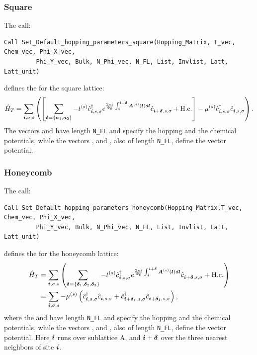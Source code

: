 \subsubsection*{Square}
The call:
\begin{lstlisting}[style=fortran]
Call Set_Default_hopping_parameters_square(Hopping_Matrix, T_vec, Chem_vec, Phi_X_vec,  
         Phi_Y_vec, Bulk, N_Phi_vec, N_FL, List, Invlist, Latt, Latt_unit)
\end{lstlisting}
defines  the   for the square  lattice: 
\begin{equation}
\hat{H}_T  =   \sum_{\boldsymbol{i}, \sigma, s}  \left( \left[ \sum_{ \boldsymbol{\delta} = \left\{ \boldsymbol{a}_1, \boldsymbol{a}_2\right\} }    - t^{(s)} \hat{c}^{\dagger}_{\boldsymbol{i},s,\sigma}   e^{\frac{2 \pi i}{\Phi_0} \int_{\boldsymbol{i}}^{\boldsymbol{i}+ \boldsymbol{\delta}}  \boldsymbol{A}^{(s)}(\boldsymbol{l})  d \boldsymbol{l}}   \hat{c}^{}_{\boldsymbol{i} + \boldsymbol{\delta},s,\sigma} +  \mathrm{H.c.}   \right]    -  \mu^{(s)} \hat{c}^{\dagger}_{\boldsymbol{i},s,\sigma} \hat{c}^{}_{\boldsymbol{i},s,\sigma}  \right).
\end{equation}
The vectors   and  have  length \texttt{N\_FL} and specify the hopping and the chemical potentials, while the  vectors ,   and ,  also of  length  \texttt{N\_FL},    define the vector potential. 


\subsubsection*{Honeycomb}
The call: 
\begin{lstlisting}[style=fortran]
Call Set_Default_hopping_parameters_honeycomb(Hopping_Matrix,T_vec, Chem_vec, Phi_X_vec,
         Phi_Y_vec, Bulk, N_Phi_vec, N_FL, List, Invlist, Latt, Latt_unit)
\end{lstlisting}
defines  the   for the  honeycomb lattice: 
\begin{align}
\hat{H}_T  &=  \sum_{\boldsymbol{i}, \sigma, s}  \left(  \sum_{ \boldsymbol{\delta} = \left\{ \boldsymbol{\delta}_1, \boldsymbol{\delta}_2, \boldsymbol{\delta}_3\right\} }    - t^{(s)} \hat{c}^{\dagger}_{\boldsymbol{i},s,\sigma}   e^{\frac{2 \pi i}{\Phi_0} \int_{\boldsymbol{i}}^{\boldsymbol{i}+ \boldsymbol{\delta}}  \boldsymbol{A}^{(s)}(\boldsymbol{l})  d \boldsymbol{l}}   \hat{c}^{}_{\boldsymbol{i} + \boldsymbol{\delta},s,\sigma} +  \mathrm{H.c.} \right)   \nonumber \\   
    &=  \sum_{\boldsymbol{i}, \sigma, s}   -  \mu^{(s)} \left( \hat{c}^{\dagger}_{\boldsymbol{i},s,\sigma} \hat{c}^{}_{\boldsymbol{i},s,\sigma}   +  \hat{c}^{\dagger}_{\boldsymbol{i} + \boldsymbol{\delta}_1,s,\sigma} \hat{c}^{}_{\boldsymbol{i} + \boldsymbol{\delta}_1,s,\sigma}   \right),
\end{align}
where the  and  have  length \texttt{N\_FL} and specify the hopping and the chemical potentials, while the  vectors ,   and ,  also of  length  \texttt{N\_FL}, define the vector potential.  Here $\boldsymbol{i}$  runs over  sublattice  A, and $\boldsymbol{i} + \boldsymbol{\delta}$  over the three nearest neighbors of site $\boldsymbol{i}$.


